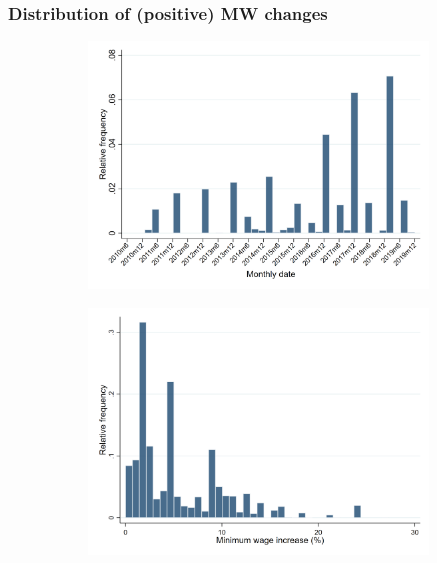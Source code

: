 \documentclass[aspectratio=169, t]{beamer}
\begin{document}
\begin{frame}[label=dist_mw_changes]
    \frametitle{Distribution of (positive) MW changes}
    \begin{figure}
        \begin{subfigure}{0.49\textwidth}
            \includegraphics[width = 0.99\textwidth]{estimation_samples/output/pct_ch_mw_date_dist.png}
        \end{subfigure}%
        \begin{subfigure}{0.49\textwidth}
            \includegraphics[width = 0.99\textwidth]{estimation_samples/output/pct_ch_mw_dist.png}
        \end{subfigure}
    \end{figure}
    
    \hyperlink{stat_MW}{}
\end{frame}
\end{document}
